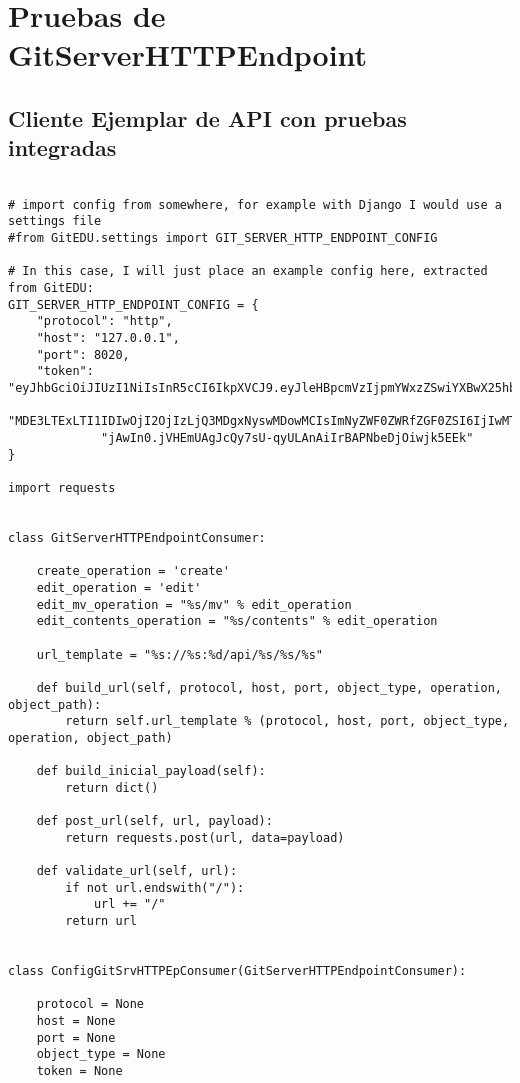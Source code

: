 \chapter{Pruebas de GitServerHTTPEndpoint}
\label{AnexoH}

\section{Cliente Ejemplar de API con pruebas integradas}
\lstset{language=Python}
\begin{lstlisting}[breaklines]

# import config from somewhere, for example with Django I would use a settings file
#from GitEDU.settings import GIT_SERVER_HTTP_ENDPOINT_CONFIG

# In this case, I will just place an example config here, extracted from GitEDU:
GIT_SERVER_HTTP_ENDPOINT_CONFIG = {
    "protocol": "http",
    "host": "127.0.0.1",
    "port": 8020,
    "token": "eyJhbGciOiJIUzI1NiIsInR5cCI6IkpXVCJ9.eyJleHBpcmVzIjpmYWxzZSwiYXBwX25hbWUiOiJHaXRFRFUiLCJlZGl0X2RhdGUiOiIy"
             "MDE3LTExLTI1IDIwOjI2OjIzLjQ3MDgxNyswMDowMCIsImNyZWF0ZWRfZGF0ZSI6IjIwMTctMTEtMjUgMjA6MjY6MjMuNDcwNzUwKzAwO"
             "jAwIn0.jVHEmUAgJcQy7sU-qyULAnAiIrBAPNbeDjOiwjk5EEk"
}

import requests


class GitServerHTTPEndpointConsumer:

    create_operation = 'create'
    edit_operation = 'edit'
    edit_mv_operation = "%s/mv" % edit_operation
    edit_contents_operation = "%s/contents" % edit_operation

    url_template = "%s://%s:%d/api/%s/%s/%s"

    def build_url(self, protocol, host, port, object_type, operation, object_path):
        return self.url_template % (protocol, host, port, object_type, operation, object_path)

    def build_inicial_payload(self):
        return dict()

    def post_url(self, url, payload):
        return requests.post(url, data=payload)

    def validate_url(self, url):
        if not url.endswith("/"):
            url += "/"
        return url


class ConfigGitSrvHTTPEpConsumer(GitServerHTTPEndpointConsumer):

    protocol = None
    host = None
    port = None
    object_type = None
    token = None


\end{lstlisting}
